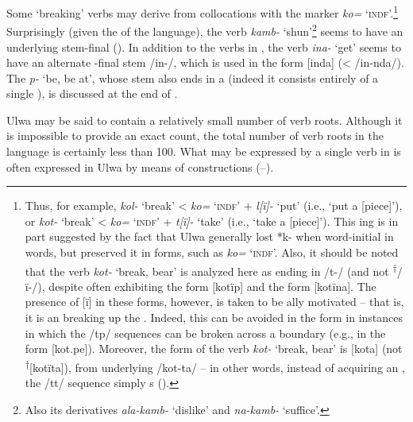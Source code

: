 Some ‘breaking’ verbs may derive from collocations with the  marker \textit{ko=} ‘\textsc{indf}’.\footnote{Thus, for example, \textit{kol-} ‘break’ < \textit{ko=} ‘\textsc{indf}’ + \textit{l[ï]-} ‘put’ (i.e., ‘put a [piece]’), or \textit{kot-} ‘break' < \textit{ko=} ‘\textsc{indf}’ + \textit{t[ï]-} ‘take’ (i.e., ‘take a [piece]’). This ing is in part suggested by the fact that Ulwa generally lost  *k- when word-initial in  words, but preserved it in  forms, such as \textit{ko=} ‘\textsc{indf}’. Also, it should be noted that the verb \textit{kot-} ‘break, bear’ is analyzed here as ending in /t-/ (and not \textsuperscript{†}/ï-/), despite often exhibiting the  form [kotïp] and the  form [kotïna]. The presence of [ï] in these forms, however, is taken to be ally motivated -- that is, it is an   breaking up the . Indeed, this  can be avoided in the  form in instances in which the /tp/ sequences can be broken across a  boundary (e.g., in the  form [kot.pe]). Moreover, the  form of the verb \textit{kot-} ‘break, bear’ is [kota] (not \textsuperscript{†}[kotïta]), from underlying /kot-ta/ -- in other words, instead of acquiring an  , the /tt/ sequence simply s ().} Surprisingly (given the  of the language), the verb \textit{kamb-} ‘shun’\footnote{Also its  derivatives \textit{ala-kamb-} ‘dislike’ and \textit{na-kamb-} ‘suffice’.} seems to have an underlying stem-final   (). In addition to the verbs in , the  verb \textit{ina-} ‘get’ seems to have an alternate -final stem /in-/, which is used in the  form [inda] (< /in-nda/). The  \textit{p-} ‘be, be at’, whose stem also ends in a  (indeed it consists entirely of a single ), is discussed at the end of .

  Ulwa may be said to contain a relatively small number of verb roots. Although it is impossible to provide an exact count, the total number of verb roots in the language is certainly less than 100. What may be expressed by a single verb in  is often expressed in Ulwa by means of  constructions (--).

